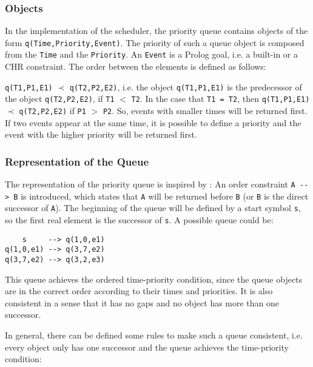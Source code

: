 \subsubsection{Objects}

In the implementation of the scheduler, the priority queue contains objects of the form \lstinline|q(Time,Priority,Event)|. The priority of such a queue object is composed from the \lstinline|Time| and the \lstinline|Priority|. An \lstinline|Event| is a Prolog goal, i.e. a built-in or a CHR constraint. The order between the elements is defined as follows:

\begin{definition}
\lstinline|q(T1,P1,E1)| $\prec$ \lstinline|q(T2,P2,E2)|, i.e. the object \lstinline|q(T1,P1,E1)| is the predecessor of the object \lstinline|q(T2,P2,E2)|, if \lstinline|T1| $<$ \lstinline|T2|. In the case that \lstinline|T1 = T2|, then \lstinline|q(T1,P1,E1)| $\prec$ \lstinline|q(T2,P2,E2)| if \lstinline|P1| $>$ \lstinline|P2|. So, events with smaller times will be returned first. If two events appear at the same time, it is possible to define a priority and the event with the higher priority will be returned first. 
\end{definition}

\subsubsection{Representation of the Queue}

The representation of the priority queue is inspired by \cite[38\psqq]{fru_chr_book_2009}: An order constraint \lstinline|A --> B| is introduced, which states that \lstinline|A| will be returned before \lstinline|B| (or \lstinline|B| is the direct successor of \lstinline|A|). The beginning of the queue will be defined by a start symbol \lstinline|s|, so the first real element is the successor of \lstinline|s|. A possible queue could be:

\begin{lstlisting}
    s     --> q(1,0,e1)
q(1,0,e1) --> q(3,7,e2)
q(3,7,e2) --> q(3,2,e3)
\end{lstlisting}

This queue achieves the ordered time-priority condition, since the queue objects are in the correct order according to their times and priorities. It is also consistent in a sense that it has no gaps and no object has more than one successor.

In general, there can be defined some rules to make such a queue consistent, i.e. every object only has one successor and the queue achieves the time-priority condition:

